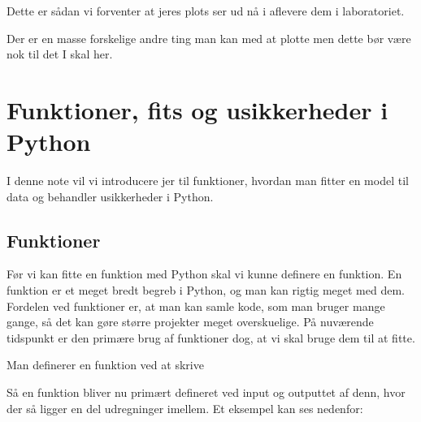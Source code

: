 \documentclass[letterpaper,10pt,english]{jupyterBook}
\begin{document}
\noindent{}

Dette er sådan vi forventer at jeres plots ser ud nå i aflevere dem i laboratoriet.

Der er en masse forskelige andre ting man kan med at plotte men dette bør være nok til det I skal her.


\section{Funktioner, fits og usikkerheder i Python}
\label{\detokenize{notebooks/MekRel/Funktioner_og_Scipy_optimize-checkpoint:funktioner-fits-og-usikkerheder-i-python}}\label{\detokenize{notebooks/MekRel/Funktioner_og_Scipy_optimize-checkpoint::doc}}
I denne note vil vi introducere jer til funktioner, hvordan man fitter en model til data og behandler usikkerheder i Python.


\subsection{Funktioner}
\label{\detokenize{notebooks/MekRel/Funktioner_og_Scipy_optimize-checkpoint:funktioner}}
Før vi kan fitte en funktion med Python skal vi kunne definere en funktion. En funktion er et meget bredt begreb i Python, og man kan rigtig meget med dem. Fordelen ved funktioner er, at man kan samle kode, som man bruger mange gange, så det kan gøre større projekter meget overskuelige. På nuværende tidspunkt er den primære brug af funktioner dog, at vi skal bruge dem til at fitte.

Man definerer en funktion ved at skrive

\begin{sphinxVerbatim}[commandchars=\\\{\}]
 
     
\end{sphinxVerbatim}

Så en funktion bliver nu primært defineret ved input og outputtet af denn, hvor der så ligger en del udregninger imellem. Et eksempel kan ses nedenfor:

\begin{sphinxVerbatim}[commandchars=\\\{\}]
 
         
\end{sphinxVerbatim}
\end{document}
